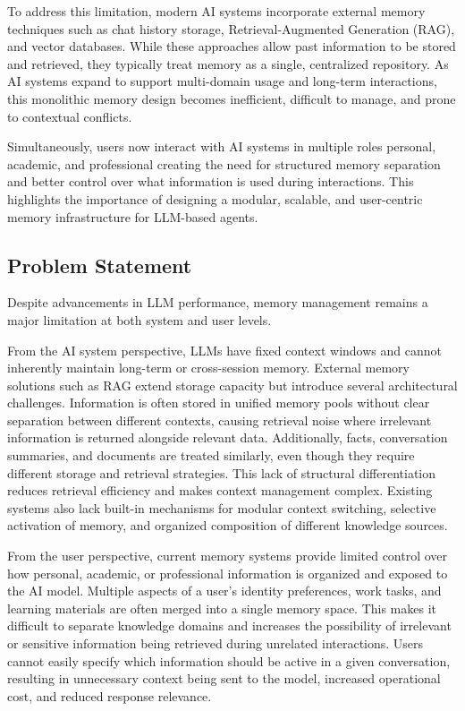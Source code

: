 \documentclass[12pt,a4paper]{article}
\begin{document}
To address this limitation, modern AI systems incorporate external memory techniques such as chat history storage, Retrieval-Augmented Generation (RAG), and vector databases. While these approaches allow past information to be stored and retrieved, they typically treat memory as a single, centralized repository. As AI systems expand to support multi-domain usage and long-term interactions, this monolithic memory design becomes inefficient, difficult to manage, and prone to contextual conflicts.

Simultaneously, users now interact with AI systems in multiple roles  personal, academic, and professional creating the need for structured memory separation and better control over what information is used during interactions. This highlights the importance of designing a modular, scalable, and user-centric memory infrastructure for LLM-based agents.

\subsection{Problem Statement}

Despite advancements in LLM performance, memory management remains a major limitation at both system and user levels.

From the AI system perspective, LLMs have fixed context windows and cannot inherently maintain long-term or cross-session memory. External memory solutions such as RAG extend storage capacity but introduce several architectural challenges. Information is often stored in unified memory pools without clear separation between different contexts, causing retrieval noise where irrelevant information is returned alongside relevant data. Additionally, facts, conversation summaries, and documents are treated similarly, even though they require different storage and retrieval strategies. This lack of structural differentiation reduces retrieval efficiency and makes context management complex. Existing systems also lack built-in mechanisms for modular context switching, selective activation of memory, and organized composition of different knowledge sources.

From the user perspective, current memory systems provide limited control over how personal, academic, or professional information is organized and exposed to the AI model. Multiple aspects of a user's identity  preferences, work tasks, and learning materials  are often merged into a single memory space. This makes it difficult to separate knowledge domains and increases the possibility of irrelevant or sensitive information being retrieved during unrelated interactions. Users cannot easily specify which information should be active in a given conversation, resulting in unnecessary context being sent to the model, increased operational cost, and reduced response relevance.
\end{document}
